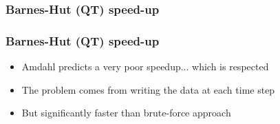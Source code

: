 \begin{frame}
  \frametitle{Barnes-Hut (QT) speed-up}
\end{frame}

\begin{frame}
\frametitle{Barnes-Hut (QT) speed-up}
\begin{itemize}
  \item Amdahl predicts a very poor speedup... which is respected
  \item The problem comes from writing the data at each time step
  \item But significantly faster than brute-force approach
\end{itemize}
\end{frame}



